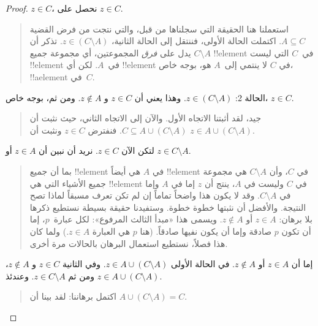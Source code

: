 \documentclass[../../../include/open-logic-section]{subfiles}
\begin{document}
\begin{proof}
  $z \in C$، نحصل على $z \in C$.
  \begin{quote}
    استعملنا هنا الحقيقة التي سجلناها من قبل، والتي نتجت من فرض القضية
    $A \subseteq C$. اكتملت الحالة الأولى، فننتقل إلى الحالة الثانية،
    $z \in (C \setminus A)$. تذكر أن $C \setminus A$ يدل على
    \emph{فرق} المجموعتين، أي مجموعة جميع !!{element} في~$C$ التي ليست
    !!{element} في~$A$. لكن أي !!{element} في $C$ لا ينتمي إلى~$A$ هو،
    بوجه خاص، !!a{element} في~$C$.
  \end{quote}
  الحالة 2: $z \in (C \setminus A)$. وهذا يعني أن $z \in C$ و
  $z \notin A$. ومن ثم، بوجه خاص، $z \in C$.
  \begin{quote}
    جيد، لقد أثبتنا الاتجاه الأول. والآن إلى الاتجاه الثاني، حيث نثبت أن
    $C \subseteq A \cup (C \setminus A)$. فنفترض $z \in C$ ونثبت أن
    $z \in A \cup (C \setminus A)$.
  \end{quote}
  لتكن الآن $z \in C$. نريد أن نبين أن $z \in A$ أو
  $z \in C \setminus A$.
  \begin{quote}
    بما أن جميع !!{element} في $A$ هي أيضاً !!{element} في $C$، وأن
    $C \setminus A$ هي مجموعة جميع الأشياء التي هي !!{element} في $C$
    وليست في $A$، ينتج أن $z$ إما في $A$ وإما في $C \setminus A$.
    وقد لا يكون هذا واضحاً تماماً إن لم تكن تعرف مسبقاً لماذا تصح
    النتيجة. والأفضل أن نثبتها خطوة خطوة. وستفيدنا حقيقة بسيطة نستطيع
    ذكرها بلا برهان: $z \in A$ أو $z \notin A$. ويسمى هذا «مبدأ الثالث
    المرفوع»: لكل عبارة~$p$، إما أن تكون $p$ صادقة وإما أن يكون نفيها
    صادقاً. (هنا $p$ هي العبارة $z \in A$.) ولما كان هذا فصلاً، نستطيع
    استعمال البرهان بالحالات مرة أخرى.
  \end{quote}
  إما أن $z \in A$ أو $z \notin A$. في الحالة الأولى
  $z \in A \cup (C \setminus A)$. وفي الثانية $z \in C$ و
  $z \notin A$، ومن ثم $z \in C \setminus A$. وعندئذ
  $z \in A \cup (C \setminus A)$.
  \begin{quote}
    اكتمل برهاننا: لقد بينا أن $A \cup (C \setminus A) = C$.
  \end{quote}
\end{proof}
\end{document}
